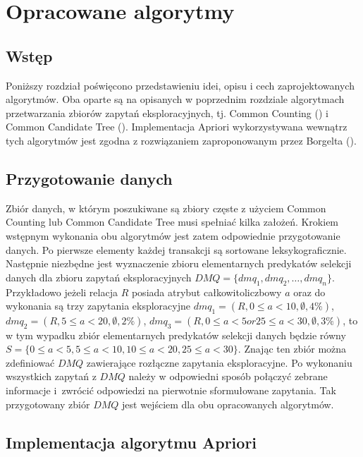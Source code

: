 \chapter{Opracowane algorytmy}
\label{c4}

\section{Wstęp}
\label{c41}
Poniższy rozdział poświęcono przedstawieniu idei, opisu i cech zaprojektowanych algorytmów. Oba oparte są na opisanych w poprzednim rozdziale algorytmach przetwarzania zbiorów zapytań eksploracyjnych, tj. Common Counting (\cite{WojciechowskiCC}) i Common Candidate Tree (\cite{WojciechowskiCCT}). Implementacja Apriori wykorzystywana wewnątrz tych algorytmów jest zgodna z rozwiązaniem zaproponowanym przez Borgelta (\cite{Borgelt}). 

\section{Przygotowanie danych}
\label{c42}
Zbiór danych, w którym poszukiwane są zbiory częste z użyciem Common Counting lub Common Candidate Tree musi spełniać kilka założeń. Krokiem wstępnym wykonania obu algorytmów jest zatem odpowiednie przygotowanie danych. Po pierwsze elementy każdej transakcji są sortowane leksykograficznie. Następnie niezbędne jest wyznaczenie zbioru elementarnych predykatów selekcji danych dla zbioru zapytań eksploracyjnych \(DMQ = \{dmq_1, dmq_2, \dots, dmq_n\}\). Przykładowo jeżeli relacja \(R\) posiada atrybut całkowitoliczbowy \(a\) oraz do wykonania są trzy zapytania eksploracyjne \(dmq_1=(R, 0 \leq a < 10, \emptyset, 4\%)\), \(dmq_2=(R, 5\leq a < 20, \emptyset, 2\%)\), \(dmq_3=(R, 0\leq a < 5 or 25\leq a < 30, \emptyset, 3\%)\), to w tym wypadku zbiór elementarnych predykatów selekcji danych będzie równy  \(S = \{0\leq a < 5, 5\leq a < 10, 10\leq a < 20, 25\leq a < 30\}\). Znając ten zbiór można zdefiniować \(DMQ\) zawierające rozłączne zapytania eksploracyjne. Po wykonaniu wszystkich zapytań z \(DMQ\) należy w odpowiedni sposób połączyć zebrane informacje i~zwrócić odpowiedzi na pierwotnie sformułowane zapytania. Tak przygotowany zbiór \(DMQ\) jest wejściem dla obu opracowanych algorytmów.

\section{Implementacja algorytmu Apriori}
\label{c43}

